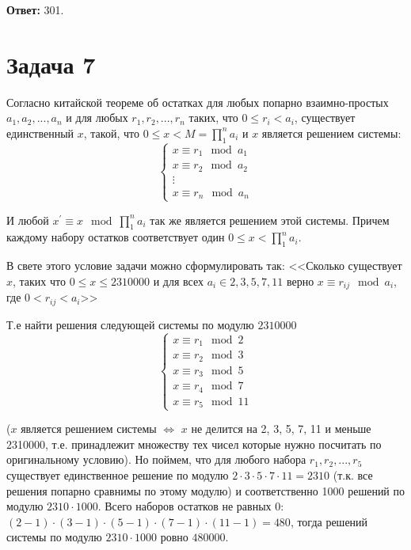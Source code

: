 \documentclass{article}
\begin{document}
		  \textbf{Ответ:} 301.
		  
		  
		  \section {Задача 7}
			   Согласно китайской теореме об остатках для любых попарно взаимно-простых $a_1, a_2, ..., a_n$ и для любых $r_1, r_2, ..., r_n$ таких, что $0 \leqslant r_i < a_i$, существует единственный $x$, такой, что $0 \leqslant x < M = \prod_{1}^{n} a_i$ и $x$ является решением системы: 
			\begin{equation*} 
				   \begin{cases}
				   x \equiv r_1 \mod a_1 \\
				   x \equiv r_2 \mod a_2 \\
				   \vdots
				   \\
				   x \equiv r_n \mod a_n
                   \end{cases}
			\end{equation*}
			
			И любой $x^\prime \equiv x \mod \prod_{1}^{n} a_i$ так же является решением этой системы. Причем каждому набору остатков соответствует один $0 \leqslant x < \prod_{1}^{n} a_i$.
			
			В свете этого условие задачи можно сформулировать так: <<Сколько существует $x$, таких что $0 \leqslant x \leqslant 2310000$  и для всех $a_i \in {2,3,5,7,11}$ верно $x \equiv r_{ij} \mod a_i$, где $0 < r_{ij} < a_i$>>
			
			Т.е найти решения следующей системы по модулю $2310000$
			\begin{equation*} 
			\begin{cases}
			x \equiv r_1 \mod 2 \\
			x \equiv r_2 \mod 3 \\
			x \equiv r_3 \mod 5 \\
			x \equiv r_4 \mod 7 \\
			x \equiv r_5 \mod 11
			\end{cases}
			\end{equation*}
			
			($x$ является решением системы $\Longleftrightarrow$ $x$ не делится на 2, 3, 5, 7, 11 и меньше 2310000, т.е. принадлежит множеству тех чисел которые нужно посчитать по оригинальному условию). Но поймем, что для любого набора ${r_1, r_2, ..., r_5}$ существует единственное решение по модулю $2 \cdot 3 \cdot 5 \cdot 7 \cdot 11 = 2310$ (т.к. все решения попарно сравнимы по этому модулю) и соответственно 1000 решений по модулю $2310 \cdot 1000$. Всего наборов остатков не равных 0: $ (2 - 1) \cdot (3 - 1) \cdot (5 - 1) \cdot (7 - 1) \cdot (11 - 1) = 480$, тогда решений системы по модулю $ 2310 \cdot 1000$ ровно $480000$.
		
\end{document}
